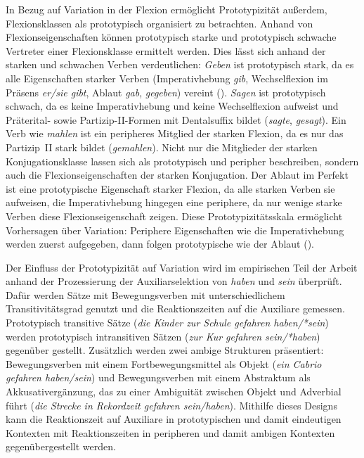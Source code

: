 In Bezug auf Variation in der Flexion ermöglicht Prototypizität außerdem, Flexionsklassen als prototypisch organisiert zu betrachten. Anhand von Flexionseigenschaften können prototypisch starke und prototypisch schwache Vertreter einer Flexionsklasse ermittelt werden. Dies lässt sich anhand der starken und schwachen Verben verdeutlichen: \textit{Geben} ist prototypisch stark, da es alle Eigenschaften starker Verben (Imperativhebung \textit{gib}, Wechselflexion im Präsens \textit{er/sie gibt}, Ablaut \textit{gab}, \textit{gegeben}) vereint (\cites[57]{Bittner.1985}[157]{Nowak.2013}). \textit{Sagen} ist prototypisch schwach, da es keine Imperativhebung und keine Wechselflexion aufweist und Präterital- sowie Partizip-II-Formen mit Dentalsuffix bildet (\textit{sagte}, \textit{gesagt}). Ein Verb wie \textit{mahlen} ist ein peripheres Mitglied der starken Flexion, da es nur das Partizip~II stark bildet (\textit{gemahlen}). Nicht nur die Mitglieder der starken Konjugationsklasse lassen sich als prototypisch und peripher beschreiben, sondern auch die Flexionseigenschaften der starken Konjugation. Der Ablaut im Perfekt ist eine prototypische Eigenschaft starker Flexion, da alle starken Verben sie aufweisen, die Imperativhebung hingegen eine periphere, da nur wenige starke Verben diese Flexionseigenschaft zeigen.  Diese Prototypizitätsskala ermöglicht Vorhersagen über Variation: Periphere Eigenschaften wie die Imperativhebung werden zuerst aufgegeben, dann folgen prototypische wie der Ablaut (\cite[57]{Bittner.1985}).

Der Einfluss der Prototypizität auf Variation wird im empirischen Teil der Arbeit anhand der Prozessierung der Auxiliarselektion von \textit{haben} und \textit{sein} überprüft. Dafür werden Sätze mit Bewegungsverben mit unterschiedlichem Transitivitätsgrad genutzt und die Reaktionszeiten auf die Auxiliare gemessen. Prototypisch transitive Sätze (\textit{die Kinder zur Schule gefahren haben/*sein}) werden prototypisch intransitiven Sätzen (\textit{zur Kur gefahren sein/*haben}) gegenüber gestellt. Zusätzlich werden zwei ambige Strukturen präsentiert: Bewegungsverben mit einem Fortbewegungsmittel als Objekt (\textit{ein Cabrio gefahren haben/sein}) und Bewegungsverben mit einem Abstraktum als Akkusativergänzung, das zu einer Ambiguität zwischen Objekt und Adverbial führt (\textit{die Strecke in Rekordzeit gefahren sein/haben}). Mithilfe dieses Designs kann die Reaktionszeit auf Auxiliare in prototypischen und damit eindeutigen Kontexten mit Reaktionszeiten in peripheren und damit ambigen Kontexten gegenübergestellt werden.

